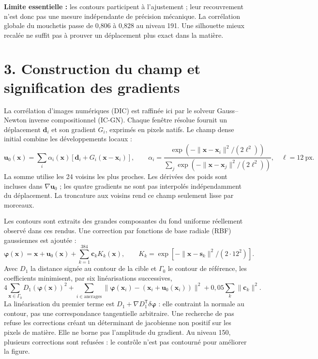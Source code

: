\documentclass[11pt,a4paper,landscape]{article}
\begin{document}
\textbf{Limite essentielle :} les contours participent à l'ajustement ; leur recouvrement n'est
donc pas une mesure indépendante de précision mécanique. La corrélation globale du mouchetis
passe de 0,806 à 0,828 au niveau 191. Une silhouette mieux recalée ne suffit pas à prouver
un déplacement plus exact dans la matière.

\newpage
\section*{3. Construction du champ et signification des gradients}
La corrélation d'images numériques (DIC) est raffinée ici par le solveur
Gauss--Newton inverse compositionnel (IC-GN). Chaque fenêtre résolue fournit un déplacement
$\mathbf d_i$ et son gradient $G_i$, exprimés en pixels natifs.
Le champ dense initial combine les développements locaux :
\[
 \mathbf u_0(\mathbf x)=\sum_i\alpha_i(\mathbf x)
 [\mathbf d_i+G_i(\mathbf x-\mathbf x_i)],\qquad
 \alpha_i=\frac{\exp(-\|\mathbf x-\mathbf x_i\|^2/(2\ell^2))}
 {\sum_j\exp(-\|\mathbf x-\mathbf x_j\|^2/(2\ell^2))},\quad \ell=12\ \mathrm{px}.
\]
La somme utilise les 24 voisins les plus proches. Les dérivées des poids sont incluses
dans $\nabla\mathbf u_0$ ; les quatre gradients ne sont pas interpolés indépendamment du déplacement.
La troncature aux voisins rend ce champ seulement lisse par morceaux.

Les contours sont extraits des grandes composantes du fond uniforme réellement observé
dans ces rendus. Une correction par fonctions de base radiale (RBF) gaussiennes est ajoutée :
\[
 \boldsymbol\varphi(\mathbf x)=\mathbf x+\mathbf u_0(\mathbf x)+
 \sum_{k=1}^{384}\mathbf c_k K_k(\mathbf x),\qquad
 K_k=\exp[-\|\mathbf x-\mathbf s_k\|^2/(2\cdot12^2)].
\]
Avec $D_1$ la distance signée au contour de la cible et $\Gamma_0$ le contour de référence,
les coefficients minimisent, par six linéarisations successives,
\[
 4\sum_{\mathbf x\in\Gamma_0}D_1(\boldsymbol\varphi(\mathbf x))^2+
 \sum_{i\in\mathrm{ancrages}}\|\boldsymbol\varphi(\mathbf x_i)-
 (\mathbf x_i+\mathbf u_0(\mathbf x_i))\|^2+0{,}05\sum_k\|\mathbf c_k\|^2.
\]
La linéarisation du premier terme est $D_1+\nabla D_1^{\mathsf T}\delta\boldsymbol\varphi$ :
elle contraint la normale au contour, pas une correspondance tangentielle arbitraire.
Une recherche de pas refuse les corrections créant un déterminant de jacobienne non positif
sur les pixels de matière. Elle ne borne pas l'amplitude du gradient. Au niveau 150,
plusieurs corrections sont refusées : le contrôle n'est pas contourné pour améliorer la figure.
\end{document}
